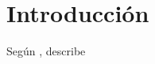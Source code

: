 	\chapter{Introducción}\label{Cap: Introducción}
		\lipsum[1-3]
		Según \cite{Schmidt-2020}, describe
		\lipsum[4]
		
		